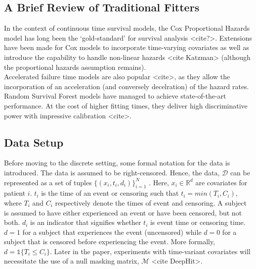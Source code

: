 \documentclass[%
 reprint,
 amsmath,amssymb,
 aps,
]{revtex4-2}
\begin{document}
\subsection{\label{trad_fits}A Brief Review of Traditional Fitters}
In the context of continuous time survival models, the Cox Proportional Hazards model has long been the `gold-standard' for survival analysis <cite?>. Extensions have been made for Cox models to incorporate time-varying covariates as well as introduce the capability to handle non-linear hazards <cite Katzman> (although the proportional hazards assumption remains).\\

Accelerated failure time models are also popular <cite>, as they allow the incorporation of an acceleration (and conversely decelration) of the hazard rates.\\

Random Survival Forest models have managed to achieve state-of-the-art performance. At the cost of higher fitting times, they deliver high discriminative power with impressive calibration <cite>.\\

\subsection{\label{setting}Data Setup}
Before moving to the discrete setting, some formal notation for the data is introduced. The data is assumed to be right-censored. Hence, the data, $\mathcal{D}$ can be represented as a set of tuples $\{(x_i , t_i , d_i)\}_{i=1}^{N}$  \cite{nagpal_deep_2021}. Here, $x_i \in \mathbb{R}^d$ are covariates for patient $i$. $t_i$ is the time of an event or censoring such that $t_i = min(T_i, C_i)$, where $T_i$ and $C_i$ respectively denote the times of event and censoring. A subject is assumed to have either experienced an event or have been censored, but not both. $d_i$ is an indicator that signifies whether $t_i$ is event time or censoring time. $d=1$ for a subject that experiences the event (uncensored) while $d=0$ for a subject that is censored before experiencing the event. More formally, $d= \mathbb{1}\{T_i \le C_i\}$. Later in the paper, experiments with time-variant covariates will necessitate the use of a null masking matrix, $\mathcal{M}$ <cite DeepHit>.\\
\end{document}

